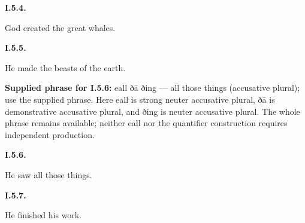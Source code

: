 \par\begin{minipage}{\linewidth}\raggedright
\textbf{I.5.4.}

God created the great whales.

\end{minipage}\par\addvspace{4pt}

\par\begin{minipage}{\linewidth}\raggedright
\textbf{I.5.5.}

He made the beasts of the earth.

\end{minipage}\par\addvspace{4pt}

\textbf{Supplied phrase for I.5.6:} eall ðā ðing — all those things (accusative plural); use the supplied phrase. Here eall is strong neuter accusative plural, ðā is demonstrative accusative plural, and ðing is neuter accusative plural. The whole phrase remains available; neither eall nor the quantifier construction requires independent production.

\par\begin{minipage}{\linewidth}\raggedright
\textbf{I.5.6.}

He saw all those things.

\end{minipage}\par\addvspace{4pt}

\par\begin{minipage}{\linewidth}\raggedright
\textbf{I.5.7.}

He finished his work.

\end{minipage}\par\addvspace{4pt}

